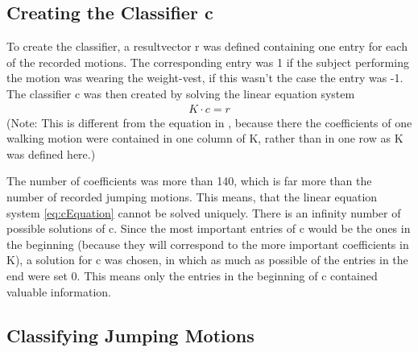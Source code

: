 \documentclass[a4paper]{article}
\begin{document}
\subsection{Creating the Classifier c}

To create the classifier, a resultvector r was defined containing one entry for each of the recorded motions. The corresponding entry was 1 if the subject performing the motion was wearing the weight-vest, if this wasn't the case the entry was -1. The classifier c was then created by solving the linear equation system
\begin{align}
	K \cdot c=r \label{eq:cEquation}
\end{align} 
(Note: This is different from the equation in \cite{origin}, because there the coefficients of one walking motion were contained in one column of K, rather than in one row as K was defined here.)

The number of coefficients was more than 140, which is far more than the number of recorded jumping motions. This means, that the linear equation system \ref{eq:cEquation} cannot be solved uniquely. There is an infinity number of possible solutions of c. Since the most important entries of c would be the ones in the beginning (because they will correspond to the more important coefficients in K), a solution for c was chosen, in which as much as possible of the entries in the end were set 0. This means only the entries in the beginning of c contained valuable information.

\subsection{Classifying Jumping Motions}
\end{document}
